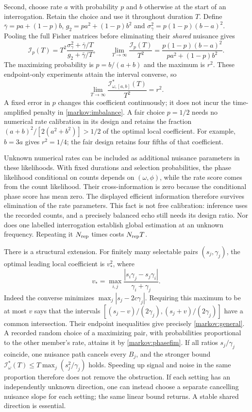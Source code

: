 \documentclass[11pt,a4paper]{article}
\numberwithin{equation}{section}
\theoremstyle{remark}
\begin{document}
Second, choose rate $a$ with probability $p$ and $b$ otherwise at the start of
an interrogation. Retain the choice and use it throughout duration $T$.
Define $\bar\gamma=pa+(1-p)b$, $g_2=pa^2+(1-p)b^2$ and
$\sigma_\gamma^2=p(1-p)(b-a)^2$. Pooling the full Fisher matrices before
eliminating their \emph{shared} nuisance gives
\begin{equation}
 \mathcal I_p(T)
 =T^2\frac{\sigma_\gamma^2+\bar\gamma/T}{g_2+\bar\gamma/T},
 \qquad
 \lim_{T\to\infty}\frac{\mathcal I_p(T)}{T^2}
 =\frac{p(1-p)(b-a)^2}{pa^2+(1-p)b^2}.
 \label{markov:mixture}
\end{equation}
The maximizing probability is $p=b/(a+b)$ and the maximum is $r^2$.
These endpoint-only experiments attain the interval converse, so
\begin{equation}
 \lim_{T\to\infty}\frac{\mathcal I^*_{\omega,[a,b]}(T)}{T^2}=r^2.
\end{equation}
A fixed error in $p$ changes this coefficient continuously; it does not incur
the time-amplified penalty in \eqref{markov:imbalance}. A fair choice $p=1/2$
needs no numerical rate calibration in its design and retains the fraction
$(a+b)^2/[2(a^2+b^2)]>1/2$ of the optimal local coefficient. For example,
$b=3a$ gives $r^2=1/4$; the fair design retains four fifths of that coefficient.

Unknown numerical rates can be included as additional nuisance parameters in
these likelihoods. With fixed durations and selection probabilities, the phase
likelihood conditional on counts depends on $(\omega,\phi)$, while the rate
score comes from the count likelihood. Their cross-information is zero because
the conditional phase score has mean zero. The displayed efficient information
therefore survives elimination of the rate parameters. This fact is not free
calibration: inference uses the recorded counts, and a precisely balanced echo
still needs its design ratio. Nor does one labelled interrogation establish
global estimation at an unknown frequency. Repeating it $N_{\rm rep}$ times costs
$N_{\rm rep}T$.

There is a structural extension. For finitely many selectable pairs
$(s_j,\gamma_j)$, the optimal leading local coefficient is $v_*^2$, where
\begin{equation}
 v_* =\max_{i,j}
 \frac{|s_i\gamma_j-s_j\gamma_i|}{\gamma_i+\gamma_j}.
 \label{markov:general}
\end{equation}
Indeed the converse minimizes $\max_j|s_j-2c\gamma_j|$. Requiring this
maximum to be at most $v$ says that the intervals
$[(s_j-v)/(2\gamma_j),(s_j+v)/(2\gamma_j)]$ have a common intersection.
Their endpoint inequalities give precisely \eqref{markov:general}. A recorded
random choice of a maximizing pair, with probabilities proportional to the
other member's rate, attains it by \eqref{markov:phasefim}. If all ratios
$s_j/\gamma_j$ coincide, one nuisance path cancels every $B_j$, and the
stronger bound $\mathcal I^*_\omega(T)\le T\max_j(s_j^2/\gamma_j)$ holds.
Speeding up signal and noise in the same proportion therefore does not remove
the obstruction. If each setting has an independently unknown direction, one
can instead choose a separate cancelling nuisance slope for each setting; the
same linear bound returns. A stable shared direction is essential.
\end{document}
